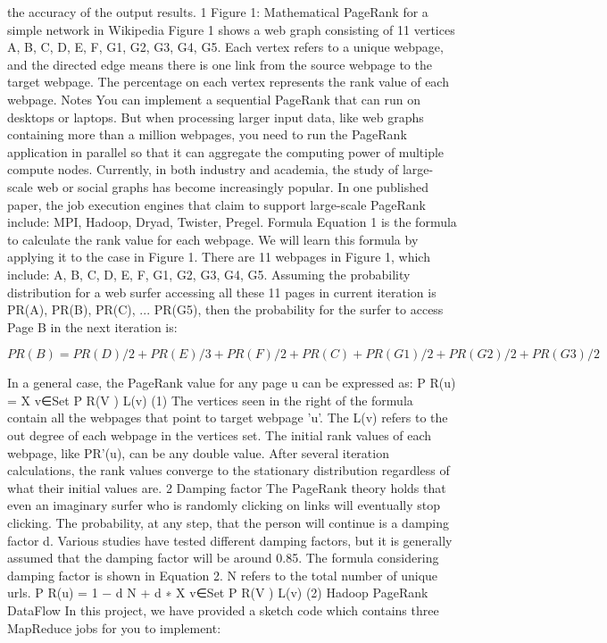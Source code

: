 the accuracy of the output results.
1
Figure 1: Mathematical PageRank for a simple network in Wikipedia
Figure 1 shows a web graph consisting of 11 vertices A, B, C, D, E, F, G1, G2, G3, G4, G5. Each vertex
refers to a unique webpage, and the directed edge means there is one link from the source webpage to the
target webpage. The percentage on each vertex represents the rank value of each webpage.
Notes
You can implement a sequential PageRank that can run on desktops or laptops. But when processing
larger input data, like web graphs containing more than a million webpages, you need to run the PageRank
application in parallel so that it can aggregate the computing power of multiple compute nodes. Currently, in
both industry and academia, the study of large-scale web or social graphs has become increasingly popular.
In one published paper, the job execution engines that claim to support large-scale PageRank include: MPI,
Hadoop, Dryad, Twister, Pregel.
Formula
Equation 1 is the formula to calculate the rank value for each webpage. We will learn this formula by
applying it to the case in Figure 1. There are 11 webpages in Figure 1, which include: A, B, C, D, E, F,
G1, G2, G3, G4, G5. Assuming the probability distribution for a web surfer accessing all these 11 pages in
current iteration is {PR(A), PR(B), PR(C), ... PR(G5)}, then the probability for the surfer to access Page
B in the next iteration is:

\[ PR(B) = P R(D)/2 + P R(E)/3 + P R(F)/2 + P R(C) + P R(G1)/2 + P R(G2)/2 + P R(G3)/2\]

In a general case, the PageRank value for any page u can be expressed as:
P R(u) = X
v∈Set
P R(V )
L(v)
(1)
The vertices seen in the right of the formula contain all the webpages that point to target webpage ’u’.
The L(v) refers to the out degree of each webpage in the vertices set. The initial rank values of each webpage,
like PR’(u), can be any double value. After several iteration calculations, the rank values converge to the
stationary distribution regardless of what their initial values are.
2
Damping factor
The PageRank theory holds that even an imaginary surfer who is randomly clicking on links will eventually
stop clicking. The probability, at any step, that the person will continue is a damping factor d. Various
studies have tested different damping factors, but it is generally assumed that the damping factor will be
around 0.85. The formula considering damping factor is shown in Equation 2. N refers to the total number
of unique urls.
P R(u) = 1 − d
N
+ d ∗
X
v∈Set
P R(V )
L(v)
(2)
Hadoop PageRank DataFlow
In this project, we have provided a sketch code which contains three
MapReduce jobs for you to implement:

